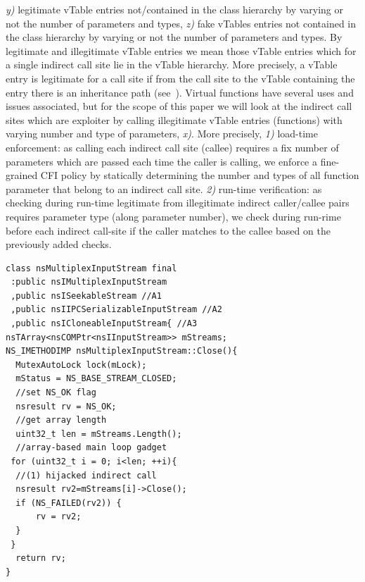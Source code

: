 \textit{y)} legitimate vTable entries not/contained in the
class hierarchy by varying or not the number of parameters and types,
\textit{z)} fake vTables entries not contained in the class hierarchy 
by varying or not the number of parameters and types.
By legitimate and illegitimate vTable entries we mean those 
vTable entries which for a single indirect call site lie in the 
vTable hierarchy. More precisely, a vTable entry is legitimate for 
a call site if from the call site to the vTable containing the entry there
is an inheritance path (see~\cite{haller:shrinkwrap}).
Virtual functions have several uses and issues associated, 
but for the scope of this paper we will look at the indirect 
call sites which are exploiter by calling illegitimate vTable entries (functions)
with varying number and type of parameters, \textit{x)}.
More precisely, 
\textit{1)} load-time enforcement: as calling each indirect call site (callee) requires 
a fix number of parameters which are passed each time the caller is calling, we
enforce a fine-grained CFI policy by statically determining the number and types of all function parameter
that belong to an indirect call site.
\textit{2)} run-time verification: as checking during run-time legitimate from
illegitimate indirect caller/callee pairs requires parameter type (along parameter number),
we check during run-rime before each indirect call-site if the caller matches to the callee 
based on the previously added checks.

\newsavebox{\firstlisting}
\begin{lrbox}{\firstlisting}
\begin{minipage}[c]{0.48\textwidth}
\begin{verbatim}
class nsMultiplexInputStream final 
 :public nsIMultiplexInputStream 
 ,public nsISeekableStream //A1
 ,public nsIIPCSerializableInputStream //A2
 ,public nsICloneableInputStream{ //A3
nsTArray<nsCOMPtr<nsIInputStream>> mStreams;
NS_IMETHODIMP nsMultiplexInputStream::Close(){
  MutexAutoLock lock(mLock);
  mStatus = NS_BASE_STREAM_CLOSED;
  //set NS_OK flag
  nsresult rv = NS_OK;
  //get array length
  uint32_t len = mStreams.Length();
  //array-based main loop gadget
 for (uint32_t i = 0; i<len; ++i){
  //(1) hijacked indirect call
  nsresult rv2=mStreams[i]->Close();
  if (NS_FAILED(rv2)) {
      rv = rv2;
  }
 }
  return rv;
}
\end{verbatim}
\end{minipage}
\end{lrbox}

